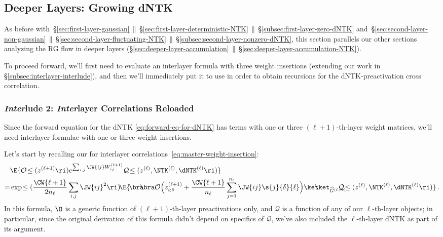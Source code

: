 \subsection{Deeper Layers: Growing dNTK}
\label{subsec:deeper-layer-growing-dNTK}
As before with~\S\ref{sec:first-layer-gaussian}$\,\parallel\,$\S\ref{sec:first-layer-deterministic-NTK}$\,\parallel\,$\S\ref{subsec:first-layer-zero-dNTK} and~\S\ref{sec:second-layer-non-gaussian}$\,\parallel\,$\S\ref{sec:second-layer-fluctuating-NTK}$\,\parallel\,$\S\ref{subsec:second-layer-nonzero-dNTK}, this section parallels our other sections analyzing the RG flow in deeper layers (\S\ref{sec:deeper-layer-accumulation}$\,\parallel\,$\S\ref{sec:deeper-layer-accumulation-NTK}). %

To proceed forward, we'll first need to evaluate an interlayer formula with three weight insertions (extending
our work in \S\ref{subsec:interlayer-interlude}), and then we'll immediately put it to use
in order to obtain
recursions for the dNTK-preactivation cross correlation. 


\subsubsection{\emph{Inter}lude 2: \emph{Inter}layer Correlations Reloaded}
Since the forward equation for the dNTK \eqref{eq:forward-eq-for-dNTK} has terms with one or three $(\ell+1)$-th-layer weight matrices, we'll need interlayer formulae with one or three weight insertions. 

Let's start by recalling our  for interlayer correlations~\eqref{eq:master-weight-insertion}: 
\begin{align}\label{eq:master-weight-insertion-reprint}
&\E{\mathcal{O}\!\le(z^{(\ell+1)}\ri)e^{\sum_{i,j} \JW{ij}W^{(\ell+1)}_{ij}}\mathcal{Q}\!\le(z^{(\ell)},  \NTK^{(\ell)}, \dNTK^{(\ell)} \ri)}\, \\
=&\exp\!\le(\frac{\CW{\ell+1}}{2n_\ell}\sum_{i,j}\JW{ij}^2\ri)\! \E{\!\bra\!\!\!\bra\mathcal{O}\Big(z^{(\ell+1)}_{i;\delta}+\frac{\CW{\ell+1}}{n_{\ell}}\sum_{j=1}^{n_{\ell}}\JW{ij}\s{j}{\delta}{\ell}\Big)\ket\!\!\!\ket_{\widehat{G}^{(\ell+1)}}\!\!\!\!\!\!\!\mathcal{Q}\!\le(z^{(\ell)},  \NTK^{(\ell)}, \dNTK^{(\ell)}\ri) }\, .\notag 
\end{align}
In this formula, $\O$ is a generic function of $(\ell+1)$-th-layer preactivations only, and $\mathcal{Q}$ is a function of any of our $\ell$-th-layer objects; in particular, since the original derivation of this formula didn't depend on specifics of $\mathcal{Q}$,
we've also included the $\ell$-th-layer dNTK as part of its argument. 



